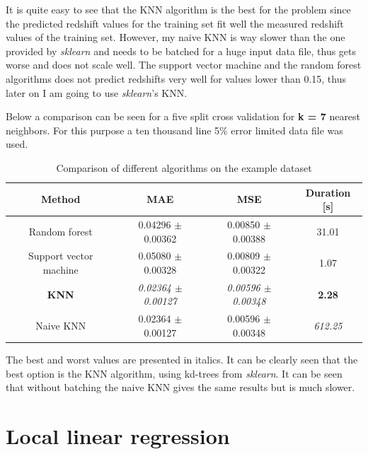 \documentclass[a4paper,12pt]{article}
\begin{document}
\par It is quite easy to see that the KNN algorithm is the best for the problem since the predicted
redshift values for the training set fit well the measured redshift values of the training set.
However, my naive KNN is way slower than the one provided by \textit{sklearn} and needs to be batched
for a huge input data file, thus gets worse and does not scale well. The support vector machine and
the random forest algorithms does not predict redshifts very well for values lower than 0.15, thus
later on I am going to use \textit{sklearn}'s KNN.

\par Below a comparison can be seen for a five split cross validation for \textbf{k = 7} nearest
neighbors. For this purpose a ten thousand line 5\% error limited data file was used.


\begin{table}[H]
	\centering
	\begin{tabular}{|c|c|c|c|}  \hline
		\textbf{Method}        & \textbf{MAE}                   & \textbf{MSE}                   & \textbf{Duration [s]} \\ \hline
		Random forest          & 0.04296 $\pm$ 0.00362          & 0.00850 $\pm$ 0.00388          & 31.01                 \\ \hline
		Support vector machine & 0.05080 $\pm$ 0.00328          & 0.00809 $\pm$ 0.00322          & 1.07                  \\ \hline
		\textbf{KNN}           & \textit{0.02364 $\pm$ 0.00127} & \textit{0.00596 $\pm$ 0.00348} & \textbf{2.28}         \\ \hline
		Naive KNN              & 0.02364 $\pm$ 0.00127          & 0.00596 $\pm$  0.00348         & \textit{612.25}       \\ \hline
	\end{tabular}
	\caption{Comparison of different algorithms on the example dataset}
\end{table}

\par The best and worst values are presented in italics. It can be clearly seen that the best
option is the KNN algorithm, using kd-trees from \textit{sklearn}. It can be seen that without
batching the naive KNN gives the same results but is much slower.

\section{ Local linear regression}
\end{document}
